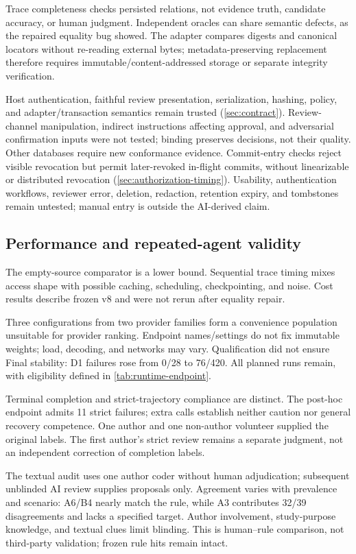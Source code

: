 Trace completeness checks persisted relations, not evidence truth, candidate accuracy, or human judgment. Independent oracles can share semantic defects, as the repaired equality bug showed. The adapter compares digests and canonical locators without re-reading external bytes; metadata-preserving replacement therefore requires immutable/content-addressed storage or separate integrity verification.

Host authentication, faithful review presentation, serialization, hashing, policy, and adapter/transaction semantics remain trusted (\cref{sec:contract}). Review-channel manipulation, indirect instructions affecting approval, and adversarial confirmation inputs were not tested; binding preserves decisions, not their quality. Other databases require new conformance evidence. Commit-entry checks reject visible revocation but permit later-revoked in-flight commits, without linearizable or distributed revocation (\cref{sec:authorization-timing}). Usability, authentication workflows, reviewer error, deletion, redaction, retention expiry, and tombstones remain untested; manual entry is outside the AI-derived claim.

\subsection{Performance and repeated-agent validity}

The empty-source comparator is a lower bound. Sequential trace timing mixes access shape with possible caching, scheduling, checkpointing, and noise. Cost results describe frozen v8 and were not rerun after equality repair.

Three configurations from two provider families form a convenience population unsuitable for provider ranking. Endpoint names/settings do not fix immutable weights; load, decoding, and networks may vary. Qualification did not ensure Final stability: D1 failures rose from 0/28 to 76/420. All planned runs remain, with eligibility defined in \cref{tab:runtime-endpoint}.

Terminal completion and strict-trajectory compliance are distinct. The post-hoc endpoint admits 11 strict failures; extra calls establish neither caution nor general recovery competence. One author and one non-author volunteer supplied the original labels. The first author's strict review remains a separate judgment, not an independent correction of completion labels.

The textual audit uses one author coder without human adjudication; subsequent unblinded AI review supplies proposals only. Agreement varies with prevalence and scenario: A6/B4 nearly match the rule, while A3 contributes 32/39 disagreements and lacks a specified target. Author involvement, study-purpose knowledge, and textual clues limit blinding. This is human--rule comparison, not third-party validation; frozen rule hits remain intact.

